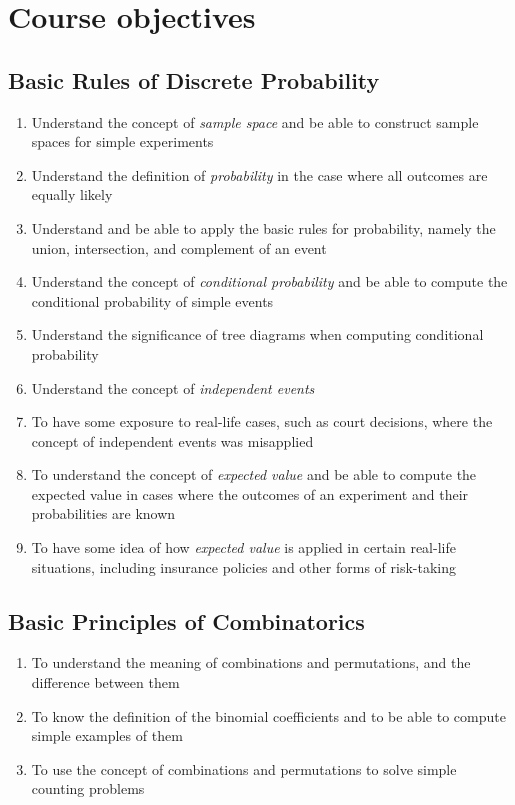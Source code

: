 \documentclass[11pt]{article}
\begin{document}
\section{Course objectives}
\subsection{Basic Rules of Discrete Probability}
\begin{enumerate}
\item Understand the concept of {\em sample space} and be able to construct sample spaces for simple experiments
\item Understand the definition of {\em probability} in the case where all outcomes are equally likely
\item Understand and be able to apply the basic rules for probability,
namely the union, intersection, and complement of an event
\item Understand the concept of {\em conditional probability}
and be able to compute the conditional probability of simple events
\item Understand the significance of tree diagrams
when computing conditional probability
\item Understand the concept of {\em independent events}
\item To have some exposure to real-life cases, such as court decisions,
where the concept of independent events was misapplied
\item To understand the concept of {\em expected value}
and be able to compute the expected value in cases where the
outcomes of an experiment and their probabilities are known
\item To have some idea of how {\em expected value}
is applied in certain real-life situations,
including insurance policies and other forms of risk-taking
\end{enumerate}
\subsection{Basic Principles of Combinatorics}
\begin{enumerate}
\item To understand the meaning of combinations and permutations,
and the difference between them
\item To know the definition of the binomial coefficients
and to be able to compute simple examples of them
\item To use the concept of combinations and permutations
to solve simple counting problems
\end{enumerate}
\end{document}
